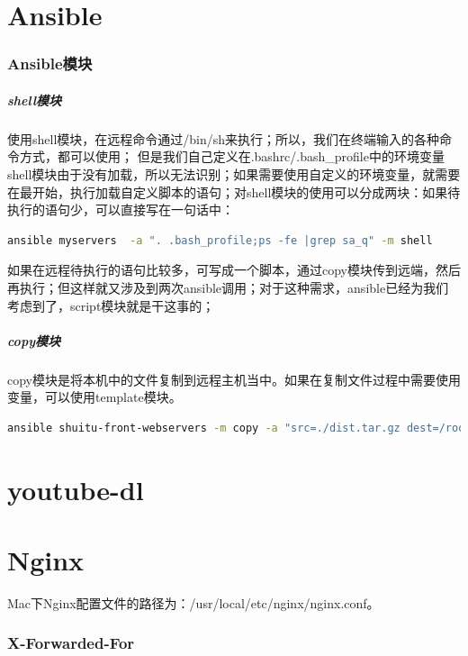 \documentclass[letter]{book}
\begin{document}
\chapter{Ansible}

\subsection{Ansible模块}

\paragraph{shell模块}使用shell模块，在远程命令通过/bin/sh来执行；所以，我们在终端输入的各种命令方式，都可以使用； 但是我们自己定义在.bashrc/.bash\_profile中的环境变量shell模块由于没有加载，所以无法识别；如果需要使用自定义的环境变量，就需要在最开始，执行加载自定义脚本的语句；对shell模块的使用可以分成两块：如果待执行的语句少，可以直接写在一句话中：

\begin{lstlisting}[language=bash]
ansible myservers  -a ". .bash_profile;ps -fe |grep sa_q" -m shell
\end{lstlisting}

如果在远程待执行的语句比较多，可写成一个脚本，通过copy模块传到远端，然后再执行；但这样就又涉及到两次ansible调用；对于这种需求，ansible已经为我们考虑到了，script模块就是干这事的；

\paragraph{copy模块}copy模块是将本机中的文件复制到远程主机当中。如果在复制文件过程中需要使用变量，可以使用template模块。

\begin{lstlisting}[language=bash]
ansible shuitu-front-webservers -m copy -a "src=./dist.tar.gz dest=/root/app-soft/"
\end{lstlisting}

\chapter{youtube-dl}


\chapter{Nginx}

Mac下Nginx配置文件的路径为：/usr/local/etc/nginx/nginx.conf。

\subsection{X-Forwarded-For}
\end{document}
